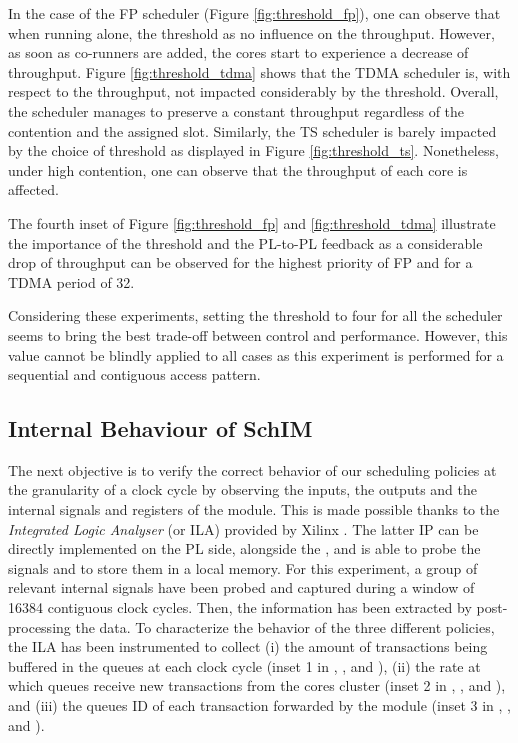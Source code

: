 In the case of the FP scheduler (Figure \ref{fig:threshold_fp}), one can observe
that when running alone, the threshold as no influence on the throughput.
However, as soon as co-runners are added, the cores start to experience a
decrease of throughput.
Figure \ref{fig:threshold_tdma} shows that the TDMA scheduler is, with respect
to the throughput, not impacted considerably by the threshold. Overall, the
scheduler manages to preserve a constant throughput regardless of the contention
and the assigned slot.
Similarly, the TS scheduler is barely impacted by the choice of threshold as
displayed in Figure \ref{fig:threshold_ts}. Nonetheless, under high
contention, one can observe that the throughput of each core is affected.

The fourth inset of Figure \ref{fig:threshold_fp} and \ref{fig:threshold_tdma}
illustrate the importance of the threshold and the PL-to-PL feedback as a
considerable drop of throughput can be observed for the highest priority of FP
and for a TDMA period of 32.

Considering these experiments, setting the threshold to four for all the scheduler
seems to bring the best trade-off between control and performance. However, this
value cannot be blindly applied to all cases as this experiment is performed for
a sequential and contiguous access pattern.

\subsection{Internal Behaviour of SchIM}
\label{subsec:internal-behaviour-of-schim}
The next objective is to verify the correct behavior of our scheduling
policies at the granularity of a clock cycle by observing the inputs,
the outputs and the internal signals and registers of the \schim
module.  This is made possible thanks to the \emph{Integrated Logic
  Analyser} (or ILA) provided by Xilinx \cite{Xilinx-ILA}. The latter
IP can be directly implemented on the PL side, alongside the \schim,
and is able to probe the signals and to store them in a local
memory. For this experiment, a group of relevant internal signals have
been probed and captured during a window of 16384 contiguous clock
cycles. Then, the information has been extracted by post-processing
the data.  To characterize the behavior of the three different
policies, the ILA has been instrumented to collect (i) the amount of
transactions being buffered in the queues at each clock cycle (inset 1
in , , and
), (ii) the rate at which queues receive
new transactions from the cores cluster (inset 2 in
, , and
), and (iii) the queues ID of each
transaction forwarded by the \schim module (inset 3 in
, , and
).

